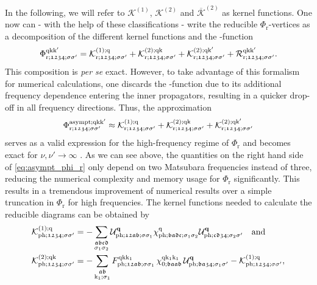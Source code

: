\documentclass[../../main.tex]{subfiles}
\begin{document}
In the following, we will refer to $\mathcal{K}^{(1)}$, $\mathcal{K}^{(2)}$ and $\overline{\mathcal{K}}^{(2)}$ as kernel functions. One now can - with the help of these classifications - write the reducible $\Phi_{\text{r}}$-vertices as a decomposition of the different kernel functions and the -function
\begin{align}
	\Phi_{\text{r};\mathfrak{1234};\sigma\sigma'}^{\text{q}\text{k}\text{k}'}=\mathcal{K}^{(1);\text{q}}_{\text{r};\mathfrak{1234};\sigma\sigma'}+\mathcal{K}^{(2);\text{q}\text{k}}_{\text{r};\mathfrak{1234};\sigma\sigma'}+\mathcal{K}^{(2);\text{q}\text{k}'}_{\text{r};\mathfrak{1234};\sigma\sigma'}+\mathcal{R}^{\text{q}\text{k}\text{k}'}_{\text{r};\mathfrak{1234};\sigma\sigma'}.
\end{align}
This composition is \textit{per se} exact. However, to take advantage of this formalism for numerical calculations, one discards the -function due to its additional frequency dependence entering the inner propagators, resulting in a quicker drop-off in all frequency directions. Thus, the approximation
\begin{align}\label{eq:asympt_phi_r}
	\Phi_{\text{r};\mathfrak{1234};\sigma\sigma'}^{\text{asympt};\text{q}\text{k}\text{k}'}\approx\mathcal{K}^{(1);\text{q}}_{\text{r};\mathfrak{1234};\sigma\sigma'}+\mathcal{K}^{(2);\text{q}\text{k}}_{\text{r};\mathfrak{1234};\sigma\sigma'}+\mathcal{K}^{(2);\text{q}\text{k}'}_{\text{r};\mathfrak{1234};\sigma\sigma'}
\end{align}
serves as a valid expression for the high-frequency regime of $\Phi_{\text{r}}$ and becomes exact for $\nu,\nu'\to\infty$ \cite{high-freq asympt}. As we can see above, the quantities on the right hand side of \eqref{eq:asympt_phi_r} only depend on two Matsubara frequencies instead of three, reducing the numerical complexity and memory usage for $\Phi_{\text{r}}$ significantly. This results in a tremendous improvement of numerical results over a simple truncation in $\Phi_{\text{r}}$ for high frequencies. The kernel functions needed to calculate the reducible diagrams can be obtained by \cite{towards ab initio dga}
\begin{align}
	\mathcal{K}^{(1);\text{q}}_{\text{ph};\mathfrak{1234};\sigma\sigma'}&=-\sum_{\substack{\mathfrak{abcd}\\\sigma_1\sigma_2}} \mathcal{U}^{\textbf{q}}_{\text{ph};\mathfrak{12ab};\sigma\sigma_1}\chi^{\text{q}}_{\text{ph};\mathfrak{badc};\sigma_1\sigma_2}\mathcal{U}^{\textbf{q}}_{\text{ph};\mathfrak{cd34};\sigma_2\sigma'}\quad\text{and}\label{eq:kernel_1}\\
	\mathcal{K}^{(2);\text{q}\text{k}}_{\text{ph};\mathfrak{1234};\sigma\sigma'}&=-\sum_{\substack{\mathfrak{ab}\\\text{k}_1;\sigma_1}} F^{\text{q}\text{k}\text{k}_1}_{\text{ph};\mathfrak{12ab};\sigma\sigma_1}\,\chi^{\text{q}\text{k}_1\text{k}_1}_{0;\mathfrak{baab}}\,\mathcal{U}^{\textbf{q}}_{\text{ph};\mathfrak{ba34};\sigma_1\sigma'}-\mathcal{K}^{(1);\text{q}}_{\text{ph};\mathfrak{1234};\sigma\sigma'},\label{eq:kernel_2}
\end{align}
\end{document}
